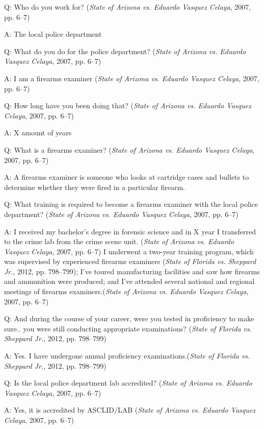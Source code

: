 \documentclass[print]{nuthesis}
\begin{document}
Q: Who do you work for? (\emph{State of {Arizona} vs. Eduardo {Vasquez} {Celaya}}, 2007, pp. 6--7)

A: The local police department

Q: What do you do for the police department? (\emph{State of {Arizona} vs. Eduardo {Vasquez} {Celaya}}, 2007, pp. 6--7)

A: I am a firearms examiner (\emph{State of {Arizona} vs. Eduardo {Vasquez} {Celaya}}, 2007, pp. 6--7)

Q: How long have you been doing that? (\emph{State of {Arizona} vs. Eduardo {Vasquez} {Celaya}}, 2007, pp. 6--7)

A: X amount of years

Q: What is a firearms examiner? (\emph{State of {Arizona} vs. Eduardo {Vasquez} {Celaya}}, 2007, pp. 6--7)

A: A firearms examiner is someone who looks at cartridge cases and bullets to determine whether they were fired in a particular firearm.

Q: What training is required to become a firearms examiner with the local police department? (\emph{State of {Arizona} vs. Eduardo {Vasquez} {Celaya}}, 2007, pp. 6--7)

A: I received my bachelor's degree in forensic science and in X year I transferred to the crime lab from the crime scene unit. (\emph{State of {Arizona} vs. Eduardo {Vasquez} {Celaya}}, 2007, pp. 6--7)
I underwent a two-year training program, which was supervised by experienced firearms examiners (\emph{State of {Florida} vs. Sheppard {Jr.}}, 2012, pp. 798--799);
I've toured manufacturing facilities and saw how firearms and ammunition were produced; and I've attended several national and regional meetings of firearms examiners.(\emph{State of {Arizona} vs. Eduardo {Vasquez} {Celaya}}, 2007, pp. 6--7)

Q: And during the course of your career, were you tested in proficiency to make sure.. you were still conducting appropriate examinations? (\emph{State of {Florida} vs. Sheppard {Jr.}}, 2012, pp. 798--799)

A: Yes. I have undergone annual proficiency examinations.(\emph{State of {Florida} vs. Sheppard {Jr.}}, 2012, pp. 798--799)

Q: Is the local police department lab accredited? (\emph{State of {Arizona} vs. Eduardo {Vasquez} {Celaya}}, 2007, pp. 6--7)

A: Yes, it is accredited by ASCLID/LAB (\emph{State of {Arizona} vs. Eduardo {Vasquez} {Celaya}}, 2007, pp. 6--7)
\end{document}
